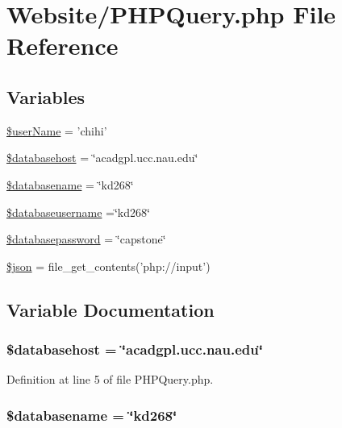 \hypertarget{_p_h_p_query_8php}{\section{Website/\-P\-H\-P\-Query.php File Reference}
\label{_p_h_p_query_8php}
}
\subsection*{Variables}
\begin{DoxyCompactItemize}
\item 
\hyperlink{_p_h_p_query_8php_aff20833df389a26c0f9384512eec4a68}{\$user\-Name} = 'chihi'
\item 
\hyperlink{_p_h_p_query_8php_a034ead57b6864a4413371711e8d65372}{\$databasehost} = \char`\"{}acadgpl.\-ucc.\-nau.\-edu\char`\"{}
\item 
\hyperlink{_p_h_p_query_8php_aace53f8afce81b52040cef0cd850138a}{\$databasename} = \char`\"{}kd268\char`\"{}
\item 
\hyperlink{_p_h_p_query_8php_a251bf75f510d7c8b556c65d7c30e911f}{\$databaseusername} =\char`\"{}kd268\char`\"{}
\item 
\hyperlink{_p_h_p_query_8php_a1a07536b6a5f43f2d8f826bd2ee6c91a}{\$databasepassword} = \char`\"{}capstone\char`\"{}
\item 
\hyperlink{_p_h_p_query_8php_acedd13b51401130848ce18f4d5c52605}{\$json} = file\-\_\-get\-\_\-contents('php\-://input')
\end{DoxyCompactItemize}


\subsection{Variable Documentation}
\hypertarget{_p_h_p_query_8php_a034ead57b6864a4413371711e8d65372}{
\subsubsection[{\$databasehost}]{\setlength{\rightskip}{0pt plus 5cm}\$databasehost = \char`\"{}acadgpl.\-ucc.\-nau.\-edu\char`\"{}}}\label{_p_h_p_query_8php_a034ead57b6864a4413371711e8d65372}


Definition at line 5 of file P\-H\-P\-Query.\-php.

\hypertarget{_p_h_p_query_8php_aace53f8afce81b52040cef0cd850138a}{
\subsubsection[{\$databasename}]{\setlength{\rightskip}{0pt plus 5cm}\$databasename = \char`\"{}kd268\char`\"{}}}\label{_p_h_p_query_8php_aace53f8afce81b52040cef0cd850138a}


